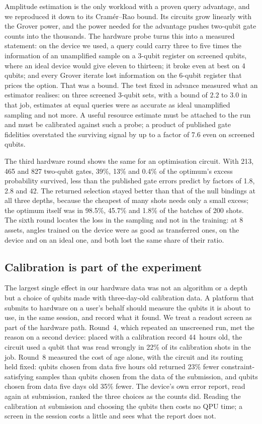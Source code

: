\documentclass[11pt,a4paper]{article}
\begin{document}
Amplitude estimation is the only workload with a proven query advantage, and
we reproduced it down to its Cram\'er--Rao bound. Its circuits grow linearly
with the Grover power, and the power needed for the advantage pushes
two-qubit gate counts into the thousands. The hardware probe turns this into
a measured statement: on the device we used, a query could carry three to
five times the information of an unamplified sample on a 3-qubit register on
screened qubits, where an ideal device would give eleven to thirteen; it
broke even at best on 4 qubits; and every Grover iterate lost information on
the 6-qubit register that prices the option. That was a bound. The test
fixed in advance measured what an estimator realises: on three screened
3-qubit sets, with a bound of $2.2$ to $3.0$ in that job, estimates at
equal queries were as accurate as ideal unamplified sampling and not more.
A useful
resource estimate must be attached to the run and must be calibrated against
such a probe; a product of published gate fidelities overstated the
surviving signal by up to a factor of 7.6 even on screened qubits.

The third hardware round shows the same for an optimisation circuit. With
213, 465 and 827 two-qubit gates, 39\%, 13\% and 0.4\% of the optimum's
excess probability survived, less than the published gate errors predict by
factors of 1.8, 2.8 and 42. The returned selection stayed better than that
of the null bindings at all three depths, because the cheapest of many shots
needs only a small excess; the optimum itself was in 98.5\%, 45.7\% and
1.8\% of the batches of 200 shots. The sixth round locates the loss in the
sampling and not in the training: at 8 assets, angles trained on the device
were as good as transferred ones, on the device and on an ideal one, and
both lost the same share of their ratio.

\subsection{Calibration is part of the experiment}

The largest single effect in our hardware data was not an algorithm or a
depth but a choice of qubits made with three-day-old calibration data. A
platform that submits to hardware on a user's behalf should measure the
qubits it is about to use, in the same session, and record what it found.
We treat a readout screen as part of the hardware path. Round~4, which
repeated an unscreened run, met the reason on a second device: placed with
a calibration record 44~hours old, the circuit used a qubit that was read
wrongly in 22\% of its calibration shots in the job. Round~8 measured the
cost of age alone, with the circuit and its routing held fixed: qubits
chosen from data five hours old returned 23\% fewer constraint-satisfying
samples than qubits chosen from the data of the submission, and qubits
chosen from data five days old 35\% fewer. The device's own error report,
read again at submission, ranked the three choices as the counts did. Reading
the calibration at submission and choosing the qubits then costs no QPU
time; a screen in the session costs a little and sees what the report does
not.
\end{document}
